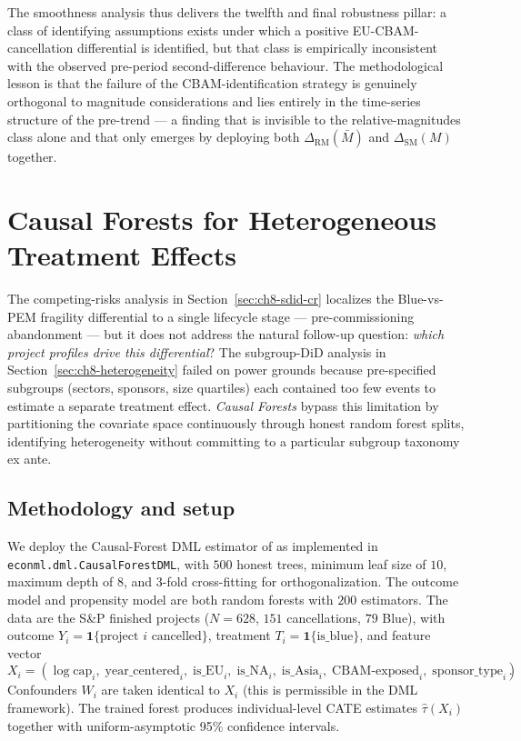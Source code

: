 \documentclass[11pt,a4paper]{article}
\begin{document}
The smoothness analysis thus delivers the twelfth and final robustness pillar: a class of identifying assumptions exists under which a positive EU-CBAM-cancellation differential is identified, but that class is empirically inconsistent with the observed pre-period second-difference behaviour. The methodological lesson is that the failure of the CBAM-identification strategy is genuinely orthogonal to magnitude considerations and lies entirely in the time-series structure of the pre-trend — a finding that is invisible to the relative-magnitudes class alone and that only emerges by deploying both $\Delta_{\mathrm{RM}}(\bar M)$ and $\Delta_{\mathrm{SM}}(M)$ together.




\section{Causal Forests for Heterogeneous Treatment Effects}
\label{sec:ch8-cf}

The competing-risks analysis in Section~\ref{sec:ch8-sdid-cr} localizes the Blue-vs-PEM fragility differential to a single lifecycle stage --- pre-commissioning abandonment --- but it does not address the natural follow-up question: \emph{which project profiles drive this differential}? The subgroup-DiD analysis in Section~\ref{sec:ch8-heterogeneity} failed on power grounds because pre-specified subgroups (sectors, sponsors, size quartiles) each contained too few events to estimate a separate treatment effect. \emph{Causal Forests} \citep{athey2019generalized,wager2018estimation} bypass this limitation by partitioning the covariate space continuously through honest random forest splits, identifying heterogeneity without committing to a particular subgroup taxonomy ex ante.

\subsection{Methodology and setup}

We deploy the Causal-Forest DML estimator of \citet{athey2019generalized} as implemented in \texttt{econml.dml.CausalForestDML}, with $500$ honest trees, minimum leaf size of $10$, maximum depth of $8$, and 3-fold cross-fitting for orthogonalization. The outcome model and propensity model are both random forests with $200$ estimators. The data are the S\&P finished projects ($N = 628$, $151$ cancellations, $79$ Blue), with outcome $Y_i = \mathbf{1}\{\text{project } i \text{ cancelled}\}$, treatment $T_i = \mathbf{1}\{\text{is\_blue}\}$, and feature vector
$$
X_i = (\log\text{cap}_i,\; \text{year\_centered}_i,\; \text{is\_EU}_i,\; \text{is\_NA}_i,\; \text{is\_Asia}_i,\; \text{CBAM-exposed}_i,\; \text{sponsor\_type}_i).
$$
Confounders $W_i$ are taken identical to $X_i$ (this is permissible in the DML framework). The trained forest produces individual-level CATE estimates $\hat\tau(X_i)$ together with uniform-asymptotic 95\% confidence intervals.
\end{document}
